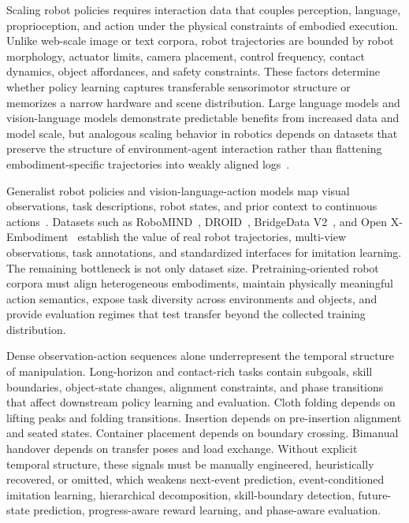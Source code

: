 Scaling robot policies requires interaction data that couples perception, language, proprioception, and action under the physical constraints of embodied execution. Unlike web-scale image or text corpora, robot trajectories are bounded by robot morphology, actuator limits, camera placement, control frequency, contact dynamics, object affordances, and safety constraints. These factors determine whether policy learning captures transferable sensorimotor structure or memorizes a narrow hardware and scene distribution. Large language models and vision-language models demonstrate predictable benefits from increased data and model scale, but analogous scaling behavior in robotics depends on datasets that preserve the structure of environment-agent interaction rather than flattening embodiment-specific trajectories into weakly aligned logs~\cite{brohan2023rt1,brohan2023rt2,ghosh2024octo,kim2024openvla,black2024pi0}.

Generalist robot policies and vision-language-action models map visual observations, task descriptions, robot states, and prior context to continuous actions~\cite{driess2023palme,brohan2023rt2,kim2024openvla,black2024pi0}. Datasets such as RoboMIND~\cite{wu2024robomind}, DROID~\cite{khazatsky2024droid}, BridgeData V2~\cite{walke2023bridgedatav2}, and Open X-Embodiment~\cite{oneill2023openx} establish the value of real robot trajectories, multi-view observations, task annotations, and standardized interfaces for imitation learning. The remaining bottleneck is not only dataset size. Pretraining-oriented robot corpora must align heterogeneous embodiments, maintain physically meaningful action semantics, expose task diversity across environments and objects, and provide evaluation regimes that test transfer beyond the collected training distribution.

Dense observation-action sequences alone underrepresent the temporal structure of manipulation. Long-horizon and contact-rich tasks contain subgoals, skill boundaries, object-state changes, alignment constraints, and phase transitions that affect downstream policy learning and evaluation. Cloth folding depends on lifting peaks and folding transitions. Insertion depends on pre-insertion alignment and seated states. Container placement depends on boundary crossing. Bimanual handover depends on transfer poses and load exchange. Without explicit temporal structure, these signals must be manually engineered, heuristically recovered, or omitted, which weakens next-event prediction, event-conditioned imitation learning, hierarchical decomposition, skill-boundary detection, future-state prediction, progress-aware reward learning, and phase-aware evaluation.

